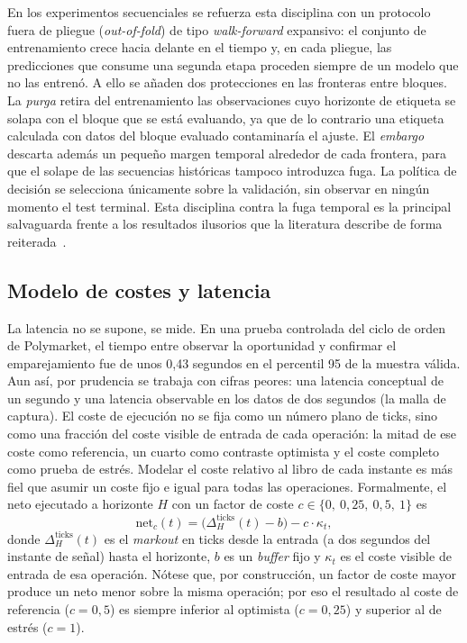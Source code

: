 En los experimentos secuenciales se refuerza esta disciplina con un protocolo fuera de
pliegue (\emph{out-of-fold}) de tipo \emph{walk-forward} expansivo: el conjunto de
entrenamiento crece hacia delante en el tiempo y, en cada pliegue, las predicciones que
consume una segunda etapa proceden siempre de un modelo que no las entrenó. A ello se añaden
dos protecciones en las fronteras entre bloques. La \emph{purga} retira del entrenamiento las
observaciones cuyo horizonte de etiqueta se solapa con el bloque que se está evaluando, ya
que de lo contrario una etiqueta calculada con datos del bloque evaluado contaminaría el
ajuste. El \emph{embargo} descarta además un pequeño margen temporal alrededor de cada
frontera, para que el solape de las secuencias históricas tampoco introduzca fuga. La
política de decisión se selecciona únicamente sobre la validación, sin observar en ningún
momento el test terminal. Esta disciplina contra la fuga temporal es la principal salvaguarda
frente a los resultados ilusorios que la literatura describe de forma
reiterada~\cite{lopezdeprado2018,gu2020empirical}.

\subsection{Modelo de costes y latencia}

La latencia no se supone, se mide. En una prueba controlada del ciclo de orden de
Polymarket, el tiempo entre observar la oportunidad y confirmar el emparejamiento fue de
unos 0,43 segundos en el percentil 95 de la muestra válida. Aun así, por prudencia se
trabaja con cifras peores: una latencia conceptual de un segundo y una latencia observable
en los datos de dos segundos (la malla de captura). El coste de ejecución no se fija como un
número plano de ticks, sino como una fracción del coste visible de entrada de cada
operación: la mitad de ese coste como referencia, un cuarto como contraste optimista y el
coste completo como prueba de estrés. Modelar el coste relativo al libro de cada instante es
más fiel que asumir un coste fijo e igual para todas las operaciones. Formalmente, el neto
ejecutado a horizonte $H$ con un factor de coste $c \in \{0,\ 0{,}25,\ 0{,}5,\ 1\}$ es
\begin{equation}
\text{net}_c(t) = \big(\Delta^{\text{ticks}}_H(t) - b\big) - c \cdot \kappa_t,
\label{eq:coste}
\end{equation}
donde $\Delta^{\text{ticks}}_H(t)$ es el \emph{markout} en ticks desde la entrada (a dos
segundos del instante de señal) hasta el horizonte, $b$ es un \emph{buffer} fijo y $\kappa_t$
es el coste visible de entrada de esa operación. Nótese que, por construcción, un factor de
coste mayor produce un neto menor sobre la misma operación; por eso el resultado al coste de
referencia ($c=0{,}5$) es siempre inferior al optimista ($c=0{,}25$) y superior al de estrés
($c=1$).

